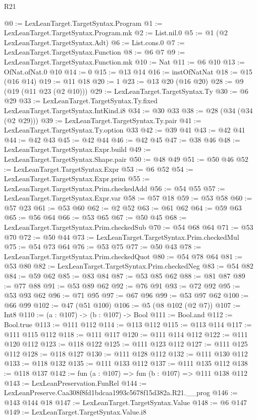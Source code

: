 \begin{lexlean}{R21}
\begin{coremodule}
@0 := LexLeanTarget.TargetSyntax.Program
@1 := LexLeanTarget.TargetSyntax.Program.mk
@2 := List.nil.{0}
@5 := @1 (@2 LexLeanTarget.TargetSyntax.Adt)
@6 := List.cons.{0}
@7 := LexLeanTarget.TargetSyntax.Function
@8 := @6 @7
@9 := LexLeanTarget.TargetSyntax.Function.mk
@10 := Nat
@11 := @6 @10
@13 := OfNat.ofNat.{0} @10
@14 := 0
@15 := @13 @14
@16 := instOfNatNat
@18 := @15 (@16 @14)
@19 := @11 @18
@20 := 1
@23 := @13 @20 (@16 @20)
@28 := @9 (@19 (@11 @23 (@2 @10)))
@29 := LexLeanTarget.TargetSyntax.Ty
@30 := @6 @29
@33 := LexLeanTarget.TargetSyntax.Ty.fixed LexLeanTarget.TargetSyntax.IntKind.i8
@34 := @30 @33
@38 := @28 (@34 (@34 (@2 @29)))
@39 := LexLeanTarget.TargetSyntax.Ty.pair
@41 := LexLeanTarget.TargetSyntax.Ty.option @33
@42 := @39 @41
@43 := @42 @41
@44 := @42 @43
@45 := @42 @44
@46 := @42 @45
@47 := @38 @46
@48 := LexLeanTarget.TargetSyntax.Expr.build
@49 := LexLeanTarget.TargetSyntax.Shape.pair
@50 := @48 @49
@51 := @50 @46
@52 := LexLeanTarget.TargetSyntax.Expr
@53 := @6 @52
@54 := LexLeanTarget.TargetSyntax.Expr.prim
@55 := LexLeanTarget.TargetSyntax.Prim.checkedAdd
@56 := @54 @55
@57 := LexLeanTarget.TargetSyntax.Expr.var
@58 := @57 @18
@59 := @53 @58
@60 := @57 @23
@61 := @53 @60
@62 := @2 @52
@63 := @61 @62
@64 := @59 @63
@65 := @56 @64
@66 := @53 @65
@67 := @50 @45
@68 := LexLeanTarget.TargetSyntax.Prim.checkedSub
@70 := @54 @68 @64
@71 := @53 @70
@72 := @50 @44
@73 := LexLeanTarget.TargetSyntax.Prim.checkedMul
@75 := @54 @73 @64
@76 := @53 @75
@77 := @50 @43
@78 := LexLeanTarget.TargetSyntax.Prim.checkedQuot
@80 := @54 @78 @64
@81 := @53 @80
@82 := LexLeanTarget.TargetSyntax.Prim.checkedNeg
@83 := @54 @82
@84 := @59 @62
@85 := @83 @84
@87 := @53 @85 @62
@88 := @81 @87
@89 := @77 @88
@91 := @53 @89 @62
@92 := @76 @91
@93 := @72 @92
@95 := @53 @93 @62
@96 := @71 @95
@97 := @67 @96
@99 := @53 @97 @62
@100 := @66 @99
@102 := @47 (@51 @100)
@106 := @5 (@8 @102 (@2 @7))
@107 := Int8
@110 := (a : @107) -> (b : @107) -> Bool
@111 := Bool.and
@112 := Bool.true
@113 := @111 @112
@114 := @113 @112
@115 := @113 @114
@117 := @111 @115 @112
@118 := @111 @117
@120 := @111 @114 @112
@122 := @111 @120 @112
@123 := @118 @122
@125 := @111 @123 @112
@127 := @111 @125 @112
@128 := @118 @127
@130 := @111 @128 @112
@132 := @111 @130 @112
@133 := @118 @132
@135 := @111 @133 @112
@137 := @111 @135 @112
@138 := @118 @137
@142 := fun (a : @107) => fun (b : @107) => @111 @138 @112
@143 := LexLeanPreservation.FunRel
@144 := LexLeanPreserve.Caa308f8fd1bdcaa1993c5678f15d382a.R21.__prog
@146 := @143 @144 @18
@147 := LexLeanTarget.TargetSyntax.Value
@148 := @6 @147
@149 := LexLeanTarget.TargetSyntax.Value.i8

\end{coremodule}
\end{lexlean}
